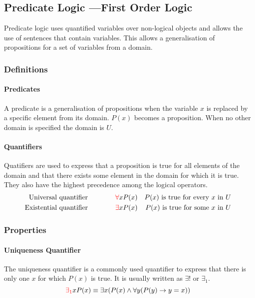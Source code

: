 \documentclass[a4paper, 10pt]{article}
\begin{document}
\newpage
\subsection[Predicate Logic]{Predicate Logic {\large ---First Order Logic}}
Predicate logic uses quantified variables over non-logical objects and allows the use of sentences that contain variables. This allows a generalisation of propositions for a set of variables from a domain.

\subsubsection{Definitions}
\paragraph{Predicates}
A predicate is a generalisation of propositions when the variable \(x\) is replaced by a specific element from its domain. \(P(x)\) becomes a proposition. When no other domain is specified the domain is \(U\).

\paragraph{Quantifiers}
Quatifiers are used to express that a proposition is true for all elements of the domain and that there exists some element in the domain for which it is true. They also have the highest precedence among the logical operators.
\begin{align*}
    \text{Universal quantifier\quad\quad\quad\quad} & \textcolor{red}{\forall} xP(x) & P(x)\text{ is true for every \(x\) in \(U\)} \\
    \text{Existential quantifier\quad\quad\quad\quad} & \textcolor{red}{\exists} xP(x) & P(x)\text{ is true for some \(x\) in \(U\)}
\end{align*}

\subsubsection{Properties}
\paragraph{Uniqueness Quantifier}
The uniqueness quantifier is a commonly used quantifier to express that there is only one \(x\) for which \(P(x)\) is true. It is usually written as \(\exists !\) or \(\exists_1\).
\[\textcolor{red}{\exists_1}xP(x)\equiv\exists x(P(x)\land\forall y(P(y)\rightarrow y=x))\]
\end{document}
